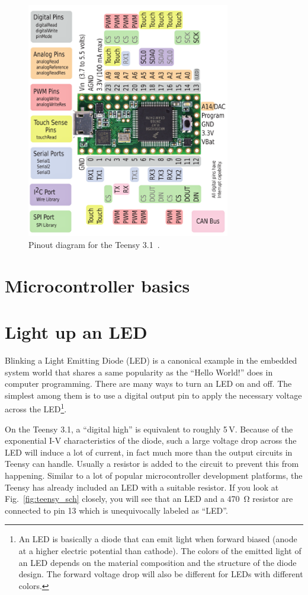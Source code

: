 \documentclass[letterpaper, 11pt]{article}
\begin{document}
\begin{figure}[ht]
	\centering
	\includegraphics[width=3.5in]{teensy_pinout.png}
	\caption{Pinout diagram for the Teensy 3.1~\cite{bib:teensy_pinout}.}
	\label{fig:teensy_pinout}
\end{figure}

\section{Microcontroller basics}

\section{Light up an LED}
Blinking a Light Emitting Diode (LED) is a canonical example in the embedded system world that shares a same popularity as the ``Hello World!'' does in computer programming. There are many ways to turn an LED on and off. The simplest among them is to use a digital output pin to apply the necessary voltage across the LED\footnote{An LED is basically a diode that can emit light when forward biased (anode at a higher electric potential than cathode). The colors of the emitted light of an LED depends on the material composition and the structure of the diode design. The forward voltage drop will also be different for LEDs with different colors.}. 

On the Teensy 3.1, a ``digital high'' is equivalent to roughly 5\,V. Because of the exponential I-V characteristics of the diode, such a large voltage drop across the LED will induce a lot of current, in fact much more than the output circuits in Teensy can handle. Usually a resistor is added to the circuit to prevent this from happening. Similar to a lot of popular microcontroller development platforms, the Teensy has already included an LED with a suitable resistor. If you look at Fig.~\ref{fig:teensy_sch} closely, you will see that an LED and a \SI{470}{\ohm} resistor are connected to pin 13 which is unequivocally labeled as ``LED''. 
\end{document}
